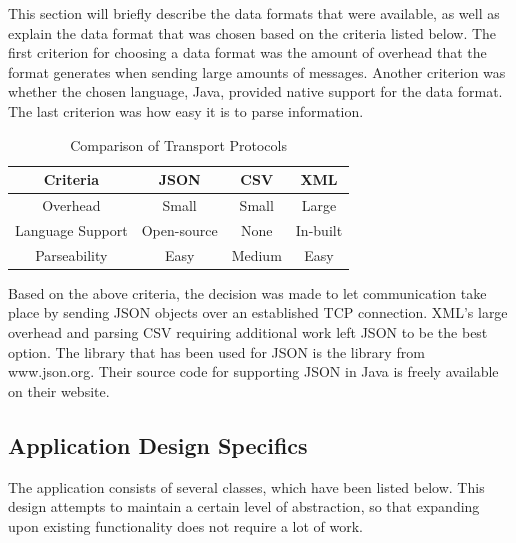 \documentclass[11pt,a4paper]{article}
\begin{document}
This section will briefly describe the data formats that were available, as well as explain the data format that was chosen based on the criteria listed below. The first criterion for choosing a data format was the amount of overhead that the format generates when sending large amounts of messages. Another criterion was whether the chosen language, Java, provided native support for the data format. The last criterion was how easy it is to parse information. 
\begin{table}[h]
	\begin{center}
		\begin{tabular}{| c || c | c | c |}
			\hline
			Criteria & JSON & CSV & XML \\ \hline
			Overhead & Small & Small & Large \\ \hline
			Language Support & Open-source & None & In-built \\ \hline
			Parseability & Easy & Medium & Easy \\ \hline
		\end{tabular}
		\caption{Comparison of Transport Protocols}
	\end{center}
\end{table}
Based on the above criteria, the decision was made to let communication take place by sending JSON objects over an established TCP connection. XML's large overhead and parsing CSV requiring additional work left JSON to be the best option.
The library that has been used for JSON is the library from www.json.org. Their source code for supporting JSON in Java is freely available on their website.

\subsection{Application Design Specifics}
The application consists of several classes, which have been listed below. This design attempts to maintain a certain level of abstraction, so that expanding upon existing functionality does not require a lot of work.
\end{document}
